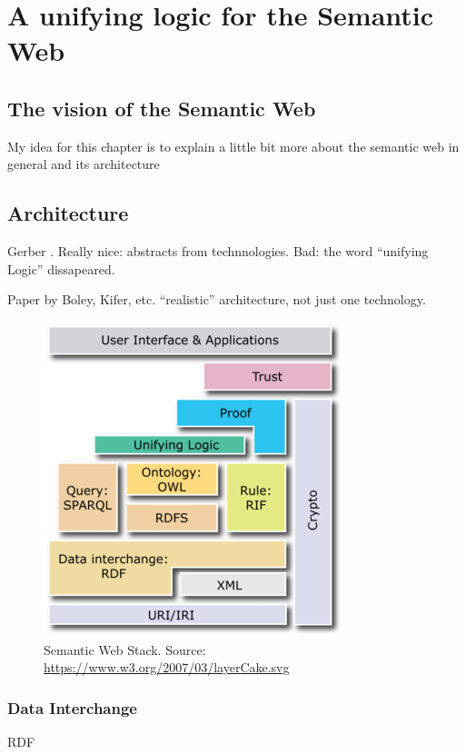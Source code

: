 \chapter{A unifying logic for the Semantic Web}
\section{The vision of the Semantic Web}
My idea for this chapter is to explain a little bit more about the semantic web in general and its architecture


\section{Architecture}

Gerber \cite{Gerber} \cite{Gerber2}. Really nice: abstracts from technnologies. Bad: the word ``unifying Logic'' dissapeared.

\cite{rearch} Paper by Boley, Kifer, etc. ``realistic'' architecture, not just one technology. 

\begin{figure}[h!]
	\centering
	\includegraphics{Semantic_Web_Stack}
	\caption{Semantic Web Stack. Source: \url{https://www.w3.org/2007/03/layerCake.svg}}
	\label{fig:stack}
\end{figure}
\subsection{Data Interchange}
RDF

